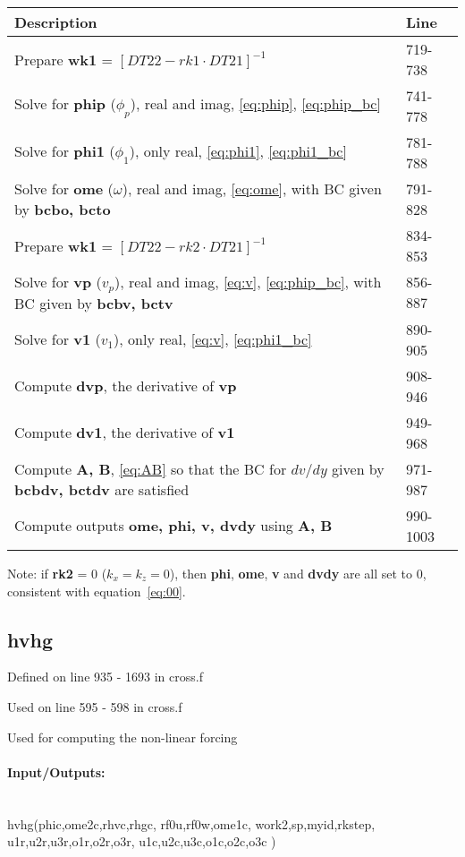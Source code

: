 \documentclass[titlepage,12pt,letter]{article}
\newcommand{\bracket}[1]{\left[ #1 \right]}
\numberwithin{equation}{section}
\begin{document}
\begin{table}[H]
	\centering 
	\renewcommand{\arraystretch}{1.5} 
	\begin{tabular}{l|l}
		Description& Line \\ \hline
		Prepare \textbf{wk1} = $\bracket{DT22 - rk1 \cdot DT21}^{-1}$ &719-738\\
		Solve for \textbf{phip} ($\phi_p$), real and imag, \eqref{eq:phip}, \eqref{eq:phip_bc}&741-778\\
		Solve for \textbf{phi1} ($\phi_1$), only real, \eqref{eq:phi1}, \eqref{eq:phi1_bc}&781-788\\
		Solve for \textbf{ome}  ($\omega$), real and imag, \eqref{eq:ome}, with BC given by \textbf{bcbo, bcto}&791-828\\
		\hdashline
		Prepare \textbf{wk1} = $\bracket{DT22 - rk2 \cdot DT21}^{-1}$ &834-853\\
		Solve for \textbf{vp} ($v_p$), real and imag, \eqref{eq:v}, \eqref{eq:phip_bc}, with BC given by \textbf{bcbv, bctv}&856-887\\
		Solve for \textbf{v1} ($v_1$), only real, \eqref{eq:v}, \eqref{eq:phi1_bc}&890-905\\
		\hdashline
		Compute \textbf{dvp}, the derivative of \textbf{vp}&908-946\\
		Compute \textbf{dv1}, the derivative of \textbf{v1}&949-968\\
		\hdashline
		Compute \textbf{A, B}, \eqref{eq:AB} so that the BC for $dv/dy$ given by \textbf{bcbdv, bctdv} are satisfied&971-987\\
		\hdashline
		Compute outputs \textbf{ome, phi, v, dvdy} using \textbf{A, B}&990-1003\\ \hline
	\end{tabular} 
\end{table}

Note: if \textbf{rk2} = 0 ($k_x = k_z = 0$), then \textbf{phi}, \textbf{ome}, \textbf{v} and \textbf{dvdy} are all set to 0, consistent with equation~\eqref{eq:00}.


\subsection{hvhg}
Defined on line 935 - 1693 in cross.f

Used on line 595 - 598 in cross.f

Used for computing the non-linear forcing 

\paragraph{Input/Outputs:}\phantom{a}\\
hvhg(phic,ome2c,rhvc,rhgc, rf0u,rf0w,ome1c, work2,sp,myid,rkstep, \\\phantom{hvhg} u1r,u2r,u3r,o1r,o2r,o3r, u1c,u2c,u3c,o1c,o2c,o3c )
\end{document}
